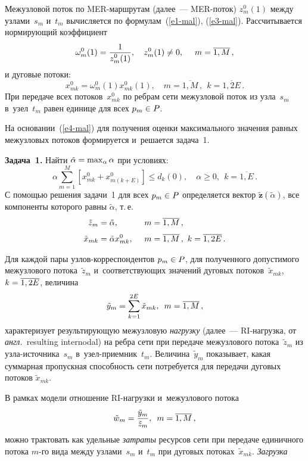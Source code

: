 \begin{multicols}{2}
Межузловой поток по MER-марш\-ру\-там (далее~---  MER-по\-ток) $z_{m}^0(1)$ между 
узлами~$s_m$ и~$t_m$ вычисляется  по формулам~(\ref{e1-mal}), (\ref{e3-mal}). Рассчитывается  
нормирующий коэффициент
$$
\omega_m^0(1) = \displaystyle\frac{\displaystyle 1\mathstrut}{\displaystyle z_{m}^0(1)\mathstrut}, \quad z_{m}^0(1) \not = 0, \quad \ m = \overline{1, M}\,, 
$$
и дуговые потоки:
\begin{equation}
x_{mk}^0 = \omega_m^0(1) x_{mk}^0(1), \quad m = \overline{1, M}\,, \ \ k = \overline{1, 2E}\,. 
\label{e4-mal}
\end{equation}
При передаче всех потоков~$x_{mk}^0$ по ребрам сети межузловой поток из узла~$s_m$ в~узел~$t_m$ равен единице для всех $p_m \hm\in P$.

На основании~(\ref{e4-mal}) для получения оценки максимального значения равных межузловых 
потоков формируется и~решается задача~1.

\smallskip

\noindent
\textbf{Задача~1.} Найти $\tilde{\alpha} \hm= \max\nolimits_{\alpha} \alpha$
при условиях:
\begin{equation*}
  \alpha \sum\limits_{m = 1}^ M [ x_{mk}^0+  x_{m(k+E)}^0] 
\le d_k(0), \quad
 \alpha \ge 0, \ \  k =\overline{1, E}\,.
\end{equation*}
С помощью решения задачи~1 для всех $p_m \hm\in P$  определяется вектор 
$\tilde{\mathbf{z}}(\tilde{\alpha})$, все компоненты которого равны 
$\tilde{\alpha}$, т.\,е. 
\begin{alignat*}{2}
\tilde{z}_m &= \tilde{\alpha},&\enskip m&=\overline{1, M}\,,  \\[3pt] 
\tilde{x}_{mk} &= \tilde{\alpha}x_{mk}^0, &\enskip m&=\overline{1, M}\,,\ k =\overline{1, 2E}\,.
\end{alignat*}

Для каждой пары узлов-кор\-рес\-пон\-ден\-тов $p_m \hm\in P$, для полученного допустимого 
межузлового потока~$\tilde{z}_m$ и~соответствующих значений дуговых потоков~$\tilde{x}_{mk}$, $k \hm= \overline{1, 2E}$, величина
$$
\tilde{y}_m = \sum\limits_{k=1}^{2E} \tilde{x}_{mk}, \enskip m = \overline{1, M}\,,
$$
характеризует результирующую межузловую \textit{нагрузку} (далее~--- RI-на\-груз\-ка, 
от \textit{англ.}\ resulting internodal) на ребра сети  при передаче  межузлового 
потока~$\tilde{z}_m$ из уз\-ла-ис\-точ\-ни\-ка~$s_m$  в~узел-при\-ем\-ник~$t_m$. Величина~$\tilde{y}_m$ 
показывает, какая суммарная пропускная способность сети 
потребуется для передачи дуговых потоков $\tilde{x}_{mk}$.

В рамках модели отношение RI-нагрузки и~межузлового потока
$$ 
\tilde{w}_m = \displaystyle\frac{\displaystyle \tilde{y}_m\mathstrut}{\displaystyle \tilde{z}_m\mathstrut},  \enskip m = \overline{1, M}\,,
$$
можно трактовать как удельные \textit{затраты}  ресурсов сети при передаче 
единичного   потока $m$-го вида между узлами~$s_m$ и~$t_m$ при  дуговых потоках~$\tilde{x}_{mk}$.  
\textit{Загрузка}


\end{multicols}
